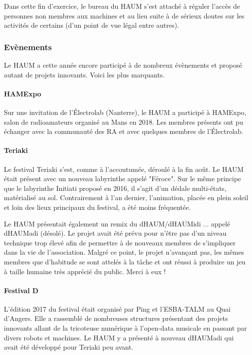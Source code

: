\documentclass[11pt]{article}
\begin{document}
Dans cette fin d'exercice, le bureau du HAUM s'est attaché à réguler l'accès de personnes
non membres aux machines et au lieu suite à de sérieux doutes sur les activités de
certains (d'un point de vue légal entre autres).

\subsubsection{Evènements}

Le HAUM a cette année encore participé à de nombreux évènements et proposé autant de
projets innovants. Voici les plus marquants.

\paragraph{HAMExpo} Sur une invitation de l'Électrolab (Nanterre), le HAUM a participé à
HAMExpo, salon de radioamateurs organisé au Mans en 2018. Les membres présents ont pu
échanger avec la communauté des RA et avec quelques membres de l'Électrolab.

\paragraph{Teriaki} Le festival Teriaki s'est, comme à l'accoutumée, déroulé à la fin
août. Le HAUM était présent avec un nouveau labyrinthe appelé "Féroce". Sur le même
principe que le labyrinthe Initiati proposé en 2016, il s'agit d'un dédale multi-états,
matérialisé au sol. Contrairement à l'an dernier, l'animation, placée en plein soleil et
loin des lieux principaux du festival, a été moins fréquentée.

Le HAUM présentait également un remix du dHAUM/dHAUMidi ... appelé dHAUMadi (désolé). Le
projet avait été prévu pour n'être pas d'un niveau technique trop élevé afin de permettre
à de nouveaux membres de s'impliquer dans la vie de l'association.  Malgré ce point, le
projet n'avançant pas, les mêmes membres que d'habitude se sont attelés à la tâche et ont
réussi à produire un jeu à taille humaine très apprécié du public. Merci à eux !

\paragraph{Festival D} L'édition 2017 du festival était organisé par Ping et l'ESBA-TALM
au Quai d'Angers. Elle a rassemblé de nombreuses structures présentant des projets
innovants allant de la tricoteuse numérique à l'open-data musicale en passant par divers
robots et machines. Le HAUM y a présenté à nouveau dHAUMadi qui avait été développé pour
Teriaki peu avant.
\end{document}

